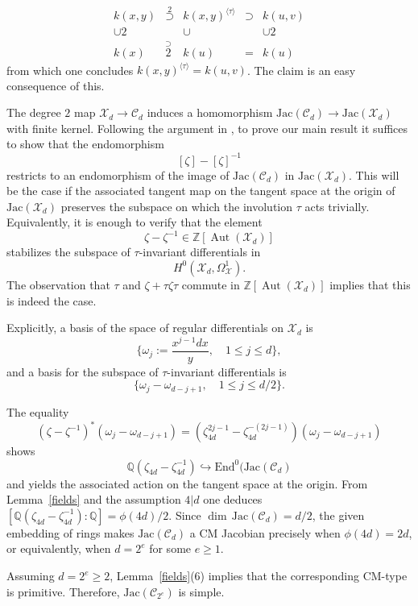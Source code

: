 \documentclass[a4paper,12pt]{amsart}
\def\cC{{\mathcal C}}
\def\cX{{\mathcal X}}
\numberwithin{equation}{section}
\theoremstyle{plain}
\numberwithin{thm}{section}
\begin{document}
\[\begin{array}{ccccc}
k(x,y) & \stackrel{\scriptstyle{2}}{\supset} & 
k(x,y)^{\langle \tau \rangle} & \supset & k(u,v)\\
\cup\scriptstyle{2} && \cup && \cup\scriptstyle{2} \\
k(x) & \stackrel{\supset}{\scriptstyle{2}} & k(u) & = & k(u)
\end{array}\]
from which one concludes $k(x,y)^{\langle \tau \rangle}=k(u,v)$. The claim is an easy
consequence of this.

The degree $2$ map $\cX_d\to\cC_d$
induces a homomorphism $\textrm{Jac}(\cC_d)\to\textrm{Jac}(\cX_d)$ with
finite kernel.
Following the argument in \cite{TTV}, to prove our main result it suffices to show that the endomorphism
\[
[ \zeta] - [ \zeta]^{-1}
\]
restricts to an endomorphism
of the image of $\textrm{Jac}(\cC_d)$
in $\textrm{Jac}(\cX_d)$. This will be the case if the associated
tangent map on the tangent space at the origin of $\textrm{Jac}(\cX_d)$ preserves the subspace on which the involution $\tau$ acts trivially. Equivalently, it is enough to verify that the element
\[
 \zeta - \zeta^{-1} \in \mathbb{Z}[\operatorname{Aut}(\cX_d)]
\]
stabilizes the subspace of $\tau$-invariant differentials in
\[
H^0(\cX_d, \Omega^1_{\cX}).
\]
The observation that $\tau$ and $\zeta+\tau\zeta\tau$ commute in $\mathbb{Z}[\operatorname{Aut}(\cX_d)]$
implies that this is indeed the case.

Explicitly, a basis of the space of regular differentials on $\cX_d$ is
\[
\{ \omega_j := \frac{x^{j-1} dx}{y}, \quad 1 \le j \le d \},
\]
and a basis for the subspace of $\tau$-invariant differentials is
\[
\{ \omega_j - \omega_{d-j+1}, \quad 1 \le j \le d/2 \}.
\]

The equality
\[
(\zeta-\zeta^{-1})^*(\omega_j-\omega_{d-j+1}) 
= (\zeta_{4d}^{2j-1}-\zeta_{4d}^{-(2j-1)})(\omega_j-\omega_{d-j+1})
\]
shows
\[\mathbb{Q}(\zeta_{4d}-\zeta_{4d}^{-1})\hookrightarrow \textrm{End}^0(\textrm{Jac}(\cC_d) \]
and yields the associated action on the
tangent space at the origin.
From Lemma~\ref{fields} and the
assumption $4|d$ one deduces
$[\mathbb{Q}(\zeta_{4d}-\zeta_{4d}^{-1}):\mathbb{Q}]=\phi(4d)/2$.
Since $\dim\,\textrm{Jac}(\cC_d)=d/2$,
the given embedding of rings makes
$\textrm{Jac}(\cC_d)$ a CM Jacobian
precisely when  $\phi(4d)=2d$,
or equivalently, when $d=2^e$ for some
$e\geq 1$.



Assuming $d=2^e\geq 2$, Lemma~\ref{fields}(6) implies that
the corresponding CM-type is primitive.
 Therefore, $\textrm{Jac}(\cC_{2^e})$ is simple.
\end{document}
